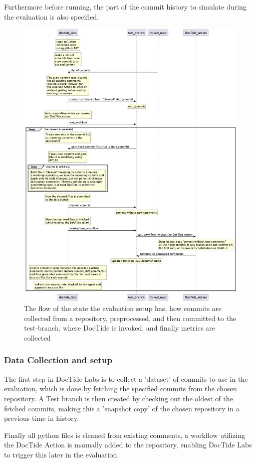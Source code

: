 Furthermore before running, the part of the commit history to simulate during the evaluation is also specified.

\begin{figure}[H]
\centering
\includegraphics[width=0.7\linewidth]{Figures/doctide_labs_flow_chart.png}
\caption{The flow of the state the evaluation setup has, how commits are collected from a repository, preprocessed, and then committed to the test-branch, where DocTide is invoked, and finally metrics are collected}
\label{fig:flow_labs}
\end{figure}

\subsubsection{Data Collection and setup}
The first step in DocTide Labs is to collect a 'dataset' of commits to use in the evaluation, which is done by fetching the specified commits from the chosen repository. A Test branch is then created by checking out the oldest of the fetched commits, making this a 'snapshot copy' of the chosen repository in a previous time in history.

Finally all python files is cleaned from existing comments, a workflow utilizing the DocTide Action is manually added to the repository, enabling DocTide Labs to trigger this later in the evaluation.

